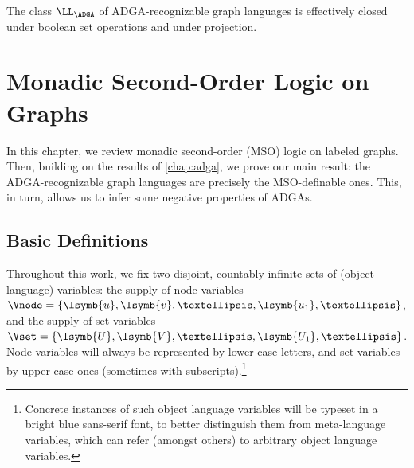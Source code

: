 \documentclass[a4paper,11pt,twoside]{report} \pdfoutput=1
\begin{document}
\begin{theorem} \label{thm:closure}
  The class $\LL_\ADGA$ of ADGA-recognizable graph languages is
  effectively closed under boolean set operations and under
  projection.
\end{theorem}
 

\chapter{Monadic Second-Order Logic on Graphs} \label{chap:msol}
In this chapter, we review monadic second-order (MSO) logic on labeled
graphs. Then, building on the results of \cref{chap:adga}, we prove
our main result: the ADGA-recognizable graph languages are precisely
the MSO-definable ones. This, in turn, allows us to infer some
negative properties of ADGAs.

\section{Basic Definitions}
Throughout this work, we fix two disjoint, countably infinite sets of
(object language) variables: the supply of node variables
$\Vnode=\{\lsymb{u},\lsymb{v},…,\lsymb{u_1},…\}$, and the supply of
set variables $\Vset=\{\lsymb{U},\lsymb{V},…,\lsymb{U_1},…\}$. Node
variables will always be represented by lower-case letters, and set
variables by upper-case ones (sometimes with
subscripts).\footnote{Concrete instances of such object language
  variables will be typeset in a bright blue sans-serif font, to
  better distinguish them from meta-language variables, which can
  refer (amongst others) to arbitrary object language variables.}
\end{document}
